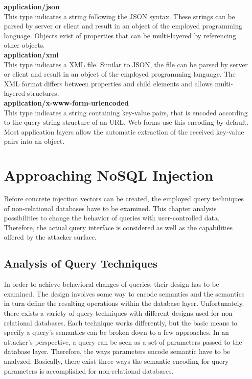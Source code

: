 \textbf{application/json} \\
This type indicates a string following the JSON syntax. These strings can be parsed by server or client and result in an object of the employed programming language. Objects exist of properties that can be multi-layered by referencing other objects. \\

\textbf{application/xml} \\
This type indicates a XML file. Similar to JSON, the file can be parsed by server or client and result in an object of the employed programming language. The XML format differs between properties and child elements and allows multi-layered structures.\\

\textbf{application/x-www-form-urlencoded} \\
This type indicates a string containing key-value pairs, that is encoded according to the query-string structure of an URL. Web forms use this encoding by default. Most application layers allow the automatic extraction of the received key-value pairs into an object.

\chapter{Approaching NoSQL Injection}
Before concrete injection vectors can be created, the employed query techniques of non-relational databases have to be examined. This chapter analysis possibilities to change the behavior of queries with user-controlled data. Therefore, the actual query interface is considered as well as the capabilities offered by the attacker surface.

\section{Analysis of Query Techniques}
In order to achieve behavioral changes of queries, their design has to be examined. The design involves some way to encode semantics and the semantics in turn define the resulting operations within the database layer. Unfortunately, there exists a variety of query techniques with different designs used for non-relational databases. Each technique works differently, but the basic means to specify a query's semantics can be broken down to a few approaches. In an attacker's perspective, a query can be seen as a set of parameters passed to the database layer. Therefore, the ways parameters encode semantic have to be analyzed. Basically, there exist three ways the semantic encoding for query parameters is accomplished for non-relational databases.\\

